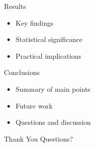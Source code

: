 \documentclass[
  11pt,
  ignorenonframetext,
]{beamer}
\providecommand{\tightlist}{%
  \setlength{\itemsep}{0pt}\setlength{\parskip}{0pt}}
\begin{document}
\begin{frame}{Results}
\protect{}\label{results}
\begin{itemize}
\tightlist
\item
  Key findings
\item
  Statistical significance
\item
  Practical implications
\end{itemize}
\end{frame}

\begin{frame}{Conclusions}
\protect{}\label{conclusions}
\begin{itemize}
\tightlist
\item
  Summary of main points
\item
  Future work
\item
  Questions and discussion
\end{itemize}
\end{frame}

\begin{frame}{Thank You}
\protect{}\label{thank-you}
Questions?
\end{frame}
\end{document}

